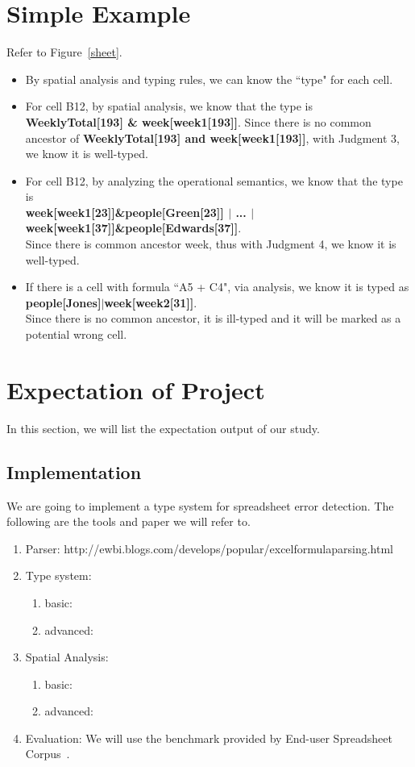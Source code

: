 \documentclass[a4paper]{article}
\begin{document}
\section{Simple Example}
Refer to Figure~\ref{sheet}.
\begin{itemize}
\item By spatial analysis and typing rules, we can know the ``type" for each cell. 
\item For cell B12, by spatial analysis, we know that the type is \textbf{WeeklyTotal[193] \& week[week1[193]]}. Since there is no common ancestor of \textbf{WeeklyTotal[193] and week[week1[193]]}, with Judgment 3, we know it is well-typed.
\item For cell B12, by analyzing the operational semantics, we know that the type is \\
\textbf{week[week1[23]]\&people[Green[23]] $|$ ... $|$ week[week1[37]]\&people[Edwards[37]]}. \\
Since there is common ancestor week, thus with Judgment 4, we know it is well-typed.
\item If there is a cell with formula ``A5 + C4", via analysis, we know it is typed as \textbf{people[Jones]$|$week[week2[31]]}.\\ 
Since there is no common ancestor, it is ill-typed and it will be marked as a potential wrong cell.
\end{itemize}

\section{Expectation of Project}
In this section, we will list the expectation output of our study.
\subsection{Implementation}
We are going to implement a type system for spreadsheet error detection. The following are the tools and paper we will refer to.
\begin{enumerate}
\item Parser: http://ewbi.blogs.com/develops/popular/excelformulaparsing.html
\item Type system:
  \begin{enumerate}
	\item basic: \cite{Abraham2006}
    \item advanced: \cite{Cunha2015}
  \end{enumerate}
\item Spatial Analysis:
  \begin{enumerate}
	\item basic: \cite{Abraham2004}
    \item advanced: \cite{Chambers2009a}
  \end{enumerate}
\item Evaluation: We will use the benchmark provided by End-user Spreadsheet Corpus~\cite{fisher2005euses}.
\end{enumerate}
\end{document}
